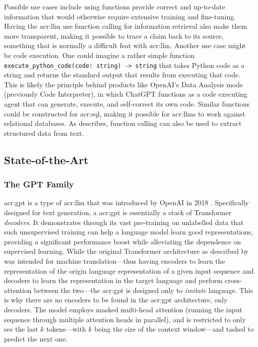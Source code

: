 Possible use cases include using functions provide correct and up-to-date information that would otherwise require extensive training and fine-tuning. Having the \gls{acr:llm} use function calling for information retrieval also make them more transparent, making it possible to trace a claim back to its source, something that is normally a difficult feat with \gls{acr:llm}. Another use case might be code execution. One could imagine a rather simple function \texttt{execute\_python\_code(code: string) -> string} that takes Python code as a string and returns the standard output that results from executing that code. This is likely the principle behind products like OpenAI's Data Analysis mode (previously Code Interpreter), in which ChatGPT functions as a code executing agent that can generate, execute, and self-correct its own code. Similar functions could be constructed for \acrshort{acr:sql}, making it possible for \glspl{acr:llm} to work against relational databases. As \cite{eletiFunctionCallingOther2023} describes, function calling can also be used to extract structured data from text.

\subsection[State-of-the-Art Models]{State-of-the-Art }
\label{subsec:sota-llms}

\subsubsection{The GPT Family}
\label{subusubsec:gpt}

\gls{acr:gpt} is a type of \gls{acr:llm} that was introduced by OpenAI in 2018 \citep{radfordImprovingLanguageUnderstanding2018}. Specifically designed for text generation, a \acrshort{acr:gpt} is essentially a stack of Transformer \textit{decoders}. It demonstrates through its vast pre-training on unlabelled data that such unsupervised training can help a language model learn good representations, providing a significant performance boost while alleviating the dependence on supervised learning. While the original Transformer architecture as described by \cite{vaswaniAttentionAllYou2017} was intended for machine translation---thus having encoders to learn the representation of the origin language representation of a given input sequence and decoders to learn the representation in the target language and perform cross-attention between the two---the \acrshort{acr:gpt} is designed only to \textit{imitate} language. This is why there are no encoders to be found in the \acrshort{acr:gpt} architecture, only decoders. The model employs masked multi-head attention (running the input sequence through multiple attention heads in parallel), and is restricted to only see the last $k$ tokens---with $k$ being the size of the context window---and tasked to predict the next one.

